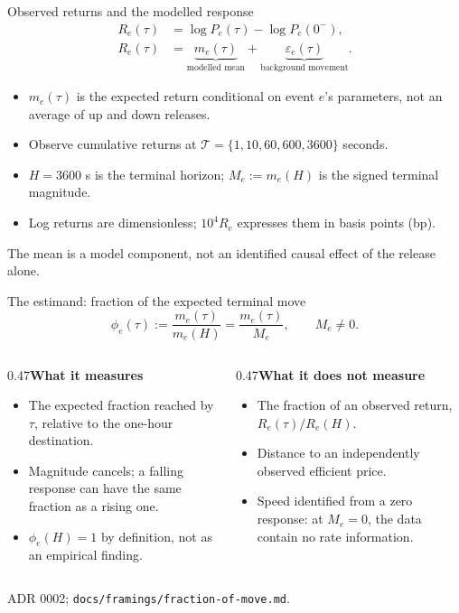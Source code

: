 \documentclass[aspectratio=169,11pt]{beamer}
\newcommand{\source}[1]{\par\vfill{\scriptsize\color{muted}#1}\par}
\newcommand{\heading}[1]{{\bfseries #1}\par\vspace{0.4em}}
\begin{document}
\begin{frame}{Observed returns and the modelled response}
\begin{align*}
R_e(\tau)&=\log P_e(\tau)-\log P_e(0^-),\\[0.4em]
R_e(\tau)&=\underbrace{m_e(\tau)}_{\text{modelled mean}}+
\underbrace{\varepsilon_e(\tau)}_{\text{background movement}}.
\end{align*}
\begin{itemize}
\item $m_e(\tau)$ is the expected return conditional on event $e$'s parameters, not an average of up and down releases.
\item Observe cumulative returns at $\mathcal T=\{1,10,60,600,3600\}$ seconds.
\item $H=3600$ s is the terminal horizon; $M_e:=m_e(H)$ is the signed terminal magnitude.
\item Log returns are dimensionless; $10^4R_e$ expresses them in basis points (bp).
\end{itemize}
\source{The mean is a model component, not an identified causal effect of the release alone.}
\end{frame}

\begin{frame}{The estimand: fraction of the expected terminal move}
\[\phi_e(\tau):=\frac{m_e(\tau)}{m_e(H)}=\frac{m_e(\tau)}{M_e},\qquad M_e\ne0.\]
\begin{columns}[T,onlytextwidth]
\begin{column}{0.47\textwidth}\heading{What it measures}
\begin{itemize}
\item The expected fraction reached by $\tau$, relative to the one-hour destination.
\item Magnitude cancels; a falling response can have the same fraction as a rising one.
\item $\phi_e(H)=1$ by definition, not as an empirical finding.
\end{itemize}\end{column}
\begin{column}{0.47\textwidth}\heading{What it does not measure}
\begin{itemize}
\item The fraction of an observed return, $R_e(\tau)/R_e(H)$.
\item Distance to an independently observed efficient price.
\item Speed identified from a zero response: at $M_e=0$, the data contain no rate information.
\end{itemize}\end{column}\end{columns}
\source{ADR 0002; \texttt{docs/framings/fraction-of-move.md}.}
\end{frame}
\end{document}
